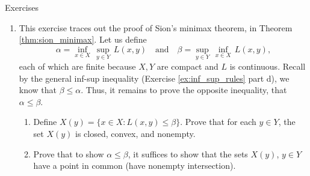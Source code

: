\begin{xcb}{Exercises}
\begin{enumerate}[label=\thechapter.\arabic*]
\begin{enumerate}[label=\alph*.]
\item Prove that the dual of \eqref{eq:dual_cone_program} is equivalent to
  \eqref{eq:primal_cone_program}. 

\item Prove that the dual cone $K^*$ is regular if $K$ is regular. 

\item When $K$ is a regular cone, conclude based on Theorem
  \ref{thm:slater_conic} that the following holds for problems 
  \eqref{eq:primal_cone_program}, \eqref{eq:dual_cone_program}.
  
  \begin{enumerate}[label=(\roman*)]  
  \item If there exists $x$ such that $Ax \leq b$ and $Px - q <_K 0 \iff q - Px 
    \in \interior(K)$, then strong duality holds. Furthermore, $f^\star >
    -\infty$ if and only if the dual is feasible, in which case a dual solution 
    exists.  
  \item If there exists $u$ and $v$ such that $P^\T u + A^\T v = -c$ and $u
    >_{K^*} 0 \iff u \in \interior(K^*)$, then strong duality
    holds. Furthermore, $g^\star < \infty$ if and only if the primal is
    feasible, in which case a primal solution exists. 
  \end{enumerate}
\end{enumerate}

\item \label{ex:sion_minimax}
  This exercise traces out the proof of Sion's minimax theorem, in Theorem 
  \ref{thm:sion_minimax}. Let us define 
  \[
  \alpha = \inf_{x \in X} \, \sup_{y \in Y} \, L(x,y) \quad \text{and} \quad  
  \beta = \sup_{y \in Y} \, \inf_{x \in X} \, L(x,y),
  \]
  each of which are finite because $X,Y$ are compact and $L$ is continuous.
  Recall by the general inf-sup inequality (Exercise \ref{ex:inf_sup_rules}
  part d), we know that $\beta \leq \alpha$. Thus, it remains to prove the
  opposite inequality, that $\alpha \leq \beta$.  

\begin{enumerate}[label=\alph*.]
\item Define $X(y) = \{x \in X : L(x,y) \leq \beta\}$. Prove that for each $y
  \in Y$, the set $X(y)$ is closed, convex, and nonempty. 
  
\item Prove that to show $\alpha \leq \beta$, it suffices to show that the sets
  $X(y)$, $y \in Y$ have a point in common (have nonempty intersection).    


\end{enumerate}
\end{enumerate}
\end{xcb}
